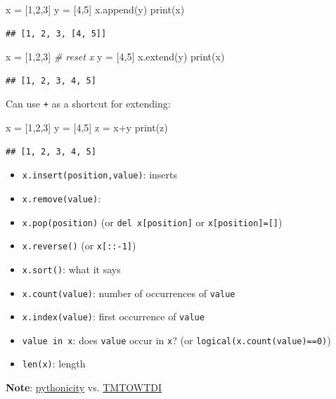 \documentclass[]{tufte-handout}
\newenvironment{Shaded}{}{}
\newcommand{\DataTypeTok}[1]{\textcolor[rgb]{0.56,0.13,0.00}{{#1}}}
\newcommand{\DecValTok}[1]{\textcolor[rgb]{0.25,0.63,0.44}{{#1}}}
\newcommand{\CommentTok}[1]{\textcolor[rgb]{0.38,0.63,0.69}{\textit{{#1}}}}
\newcommand{\NormalTok}[1]{{#1}}
\begin{document}
\begin{Shaded}
\begin{Highlighting}[]
\NormalTok{x = [}\DecValTok{1}\NormalTok{,}\DecValTok{2}\NormalTok{,}\DecValTok{3}\NormalTok{]}
\NormalTok{y = [}\DecValTok{4}\NormalTok{,}\DecValTok{5}\NormalTok{]}
\NormalTok{x.append(y)}
\DataTypeTok{print}\NormalTok{(x)}
\end{Highlighting}
\end{Shaded}

\begin{verbatim}
## [1, 2, 3, [4, 5]]
\end{verbatim}

\begin{Shaded}
\begin{Highlighting}[]
\NormalTok{x = [}\DecValTok{1}\NormalTok{,}\DecValTok{2}\NormalTok{,}\DecValTok{3}\NormalTok{] }\CommentTok{# reset x}
\NormalTok{y = [}\DecValTok{4}\NormalTok{,}\DecValTok{5}\NormalTok{]}
\NormalTok{x.extend(y)}
\DataTypeTok{print}\NormalTok{(x)}
\end{Highlighting}
\end{Shaded}

\begin{verbatim}
## [1, 2, 3, 4, 5]
\end{verbatim}

Can use \texttt{+} as a shortcut for extending:

\begin{Shaded}
\begin{Highlighting}[]
\NormalTok{x = [}\DecValTok{1}\NormalTok{,}\DecValTok{2}\NormalTok{,}\DecValTok{3}\NormalTok{]}
\NormalTok{y = [}\DecValTok{4}\NormalTok{,}\DecValTok{5}\NormalTok{]}
\NormalTok{z = x+y}
\DataTypeTok{print}\NormalTok{(z)}
\end{Highlighting}
\end{Shaded}

\begin{verbatim}
## [1, 2, 3, 4, 5]
\end{verbatim}

\begin{itemize}
\itemsep1pt\parskip0pt
\item
  \texttt{x.insert(position,value)}: inserts
\item
  \texttt{x.remove(value)}:
\item
  \texttt{x.pop(position)} (or \texttt{del x{[}position{]}} or
  \texttt{x{[}position{]}={[}{]}})
\item
  \texttt{x.reverse()} (or \texttt{x{[}::-1{]}})
\item
  \texttt{x.sort()}: what it says
\item
  \texttt{x.count(value)}: number of occurrences of \texttt{value}
\item
  \texttt{x.index(value)}: first occurrence of \texttt{value}
\item
  \texttt{value in x}: does \texttt{value} occur in \texttt{x}? (or
  \texttt{logical(x.count(value)==0)})
\item
  \texttt{len(x)}: length
\end{itemize}

\textbf{Note}:
\href{http://blog.startifact.com/posts/older/what-is-pythonic.html}{pythonicity}
vs.
\href{http://en.wikipedia.org/wiki/There\%27s_more_than_one_way_to_do_it}{TMTOWTDI}
\end{document}
